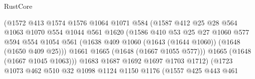 \begin{lexlean}{RustCore}
\begin{coremodule}
                                  (@1572
                                    @413
                                    @1574
                                    @1576
                                    @1064
                                    @1071
                                    @584
                                    (@1587
                                      @412
                                      @25
                                      @28
                                      @564
                                      @1063
                                      @1070
                                      @554
                                      @1044
                                      @561
                                      @1620
                                      (@1586
                                        @410
                                        @53
                                        @25
                                        @27
                                        @1060
                                        @577
                                        @594
                                        @554
                                        @1054
                                        @561
                                        (@1638
                                          @409
                                          @1060
                                          (@1643 (@1644 @1060))
                                          (@1648 (@1650 @409 @25)))
                                        @1661
                                        @1665
                                        (@1648 (@1667 @1055 @577)))
                                      @1665
                                      (@1648 (@1667 @1045 @1063)))
                                    @1683
                                    @1687
                                    @1692
                                    @1697
                                    @1703
                                    @1712)
                                  (@1723
                                    @1073
                                    @462
                                    @510
                                    @32
                                    @1098
                                    @1124
                                    @1150
                                    @1176
                                    (@1557
                                      @425
                                      @443
                                      @461

\end{coremodule}
\end{lexlean}

